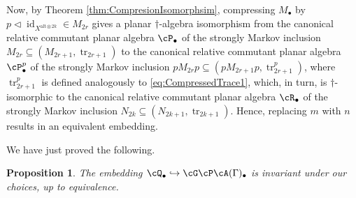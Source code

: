 \documentclass[11pt]{article}
\theoremstyle{plain}
\newtheorem{prop}[thm]{Proposition}
\theoremstyle{definition}
\DeclareMathOperator{\id}{id}
\DeclareMathOperator{\tr}{tr}
\begin{document}
Now, by Theorem \ref{thm:CompresionIsomorphsim}, compressing $M_\bullet$ by $p\vartriangleleft \id_{X^{\text{alt}\otimes 2k}} \in M_{2r}$ gives a planar $\dag$-algebra isomorphism from the canonical relative commutant planar algebra $\cP_\bullet$ of the strongly Markov inclusion $M_{2r} \subseteq (M_{2r+1}, \tr_{2r+1})$ to the
canonical relative commutant planar algebra $\cP^p_\bullet$ of the strongly Markov inclusion $pM_{2r}p \subseteq (pM_{2r+1}p, \tr^p_{2r+1})$, where $\tr^p_{2r+1}$ is defined analogously to \eqref{eq:CompressedTrace1}, which, in turn, is $\dag$-isomorphic to the canonical relative commutant planar algebra $\cR_\bullet$ of the strongly Markov inclusion $N_{2k} \subseteq (N_{2k+1}, \tr_{2k+1})$.
Hence, replacing $m$ with $n$ results in an equivalent embedding.

We have just proved the following.

\begin{prop}
The embedding $\cQ_\bullet \hookrightarrow \cG\cP\cA(\Gamma)_\bullet$ is invariant under our choices, up to equivalence.
\end{prop}



{\footnotesize{

}}
\end{document}
